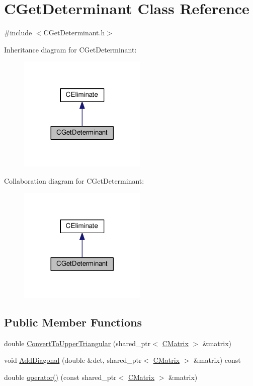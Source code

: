 \hypertarget{classCGetDeterminant}{}\section{C\+Get\+Determinant Class Reference}
\label{classCGetDeterminant}


{\ttfamily \#include $<$C\+Get\+Determinant.\+h$>$}



Inheritance diagram for C\+Get\+Determinant\+:\nopagebreak
\begin{figure}[H]
\begin{center}
\leavevmode
\includegraphics[width=173pt]{classCGetDeterminant__inherit__graph}
\end{center}
\end{figure}


Collaboration diagram for C\+Get\+Determinant\+:\nopagebreak
\begin{figure}[H]
\begin{center}
\leavevmode
\includegraphics[width=173pt]{classCGetDeterminant__coll__graph}
\end{center}
\end{figure}
\subsection*{Public Member Functions}
\begin{DoxyCompactItemize}
\item 
double \hyperlink{classCGetDeterminant_a38a5991c1bff7ad04e8e28c20f48f0e2}{Convert\+To\+Upper\+Triangular} (shared\+\_\+ptr$<$ \hyperlink{classCMatrix}{C\+Matrix} $>$ \&matrix)
\item 
void \hyperlink{classCGetDeterminant_ac69458971216a7ff77c4bf08d78f3d45}{Add\+Diagonal} (double \&det, shared\+\_\+ptr$<$ \hyperlink{classCMatrix}{C\+Matrix} $>$ \&matrix) const 
\item 
double \hyperlink{classCGetDeterminant_abf9bf718e3a52b7a200db3e0c248d0db}{operator()} (const shared\+\_\+ptr$<$ \hyperlink{classCMatrix}{C\+Matrix} $>$ \&matrix)
\end{DoxyCompactItemize}

